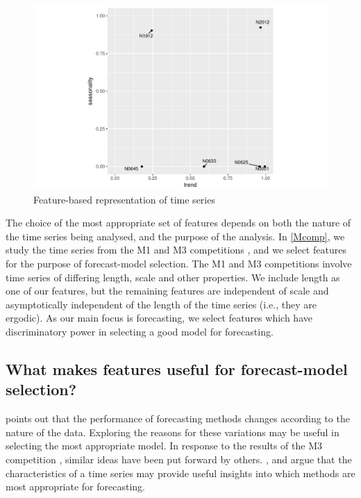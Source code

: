 \documentclass[11pt,a4paper,]{article}
\begin{document}
\begin{figure}

{\centering \includegraphics[width=0.7\linewidth]{figure/fig2-1} 

}

\caption{Feature-based representation of time series}\label{fig:fig2}
\end{figure}

The choice of the most appropriate set of features depends on both the
nature of the time series being analysed, and the purpose of the
analysis. In \autoref{Mcomp}, we study the time series from the M1 and
M3 competitions \autocites{makridakis1982accuracy}{makridakis2000m3},
and we select features for the purpose of forecast-model selection. The
M1 and M3 competitions involve time series of differing length, scale
and other properties. We include length as one of our features, but the
remaining features are independent of scale and asymptotically
independent of the length of the time series (i.e., they are ergodic).
As our main focus is forecasting, we select features which have
discriminatory power in selecting a good model for forecasting.

\subsection{What makes features useful for forecast-model
selection?}\label{what-makes-features-useful-for-forecast-model-selection}

\textcite{reid1972comparison} points out that the performance of
forecasting methods changes according to the nature of the data.
Exploring the reasons for these variations may be useful in selecting
the most appropriate model. In response to the results of the M3
competition \autocite{makridakis2000m3}, similar ideas have been put
forward by others. \textcite{hyndman2001s}, \textcite{lawrence2001s} and
\textcite{armstrong2001s} argue that the characteristics of a time
series may provide useful insights into which methods are most
appropriate for forecasting.
\end{document}
